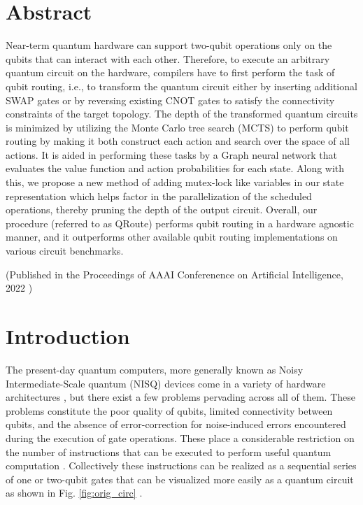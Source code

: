 \section{\label{sec:abstract}Abstract}

Near-term quantum hardware can support two-qubit operations only on the qubits that can interact with each other. Therefore, to execute an arbitrary quantum circuit on the hardware, compilers have to first perform the task of qubit routing, i.e., to transform the quantum circuit either by inserting additional SWAP gates or by reversing existing CNOT gates to satisfy the connectivity constraints of the target topology.  The depth of the transformed quantum circuits is minimized by utilizing the Monte Carlo tree search (MCTS) to perform qubit routing by making it both construct each action and search over the space of all actions. It is aided in performing these tasks by a Graph neural network that evaluates the value function and action probabilities for each state. Along with this, we propose a new method of adding mutex-lock like variables in our state representation which helps factor in the parallelization of the scheduled operations, thereby pruning the depth of the output circuit. Overall, our procedure (referred to as QRoute) performs qubit routing in a hardware agnostic manner, and it outperforms other available qubit routing implementations on various circuit benchmarks.

{\smaller (Published in the Proceedings of AAAI Conferenence on Artificial Intelligence, 2022 \cite{self-qroute})}    

\section{\label{sec:intro}Introduction}

The present-day quantum computers, more generally known as Noisy Intermediate-Scale quantum (NISQ) devices \cite{nisq_preskill} come in a variety of hardware architectures \cite{IBMQ, hardware_sycamore, hardware_rigetti_aspen, hardware_xanadu}, but there exist a few problems pervading across all of them. These problems constitute the poor quality of qubits, limited connectivity between qubits, and the absence of error-correction for noise-induced errors encountered during the execution of gate operations. These place a considerable restriction on the number of instructions that can be executed to perform useful quantum computation \cite{nisq_preskill}. Collectively these instructions can be realized as a sequential series of one or two-qubit gates that can be visualized more easily as a quantum circuit as shown in Fig. \ref{fig:orig_circ} \cite{others_childs}.

